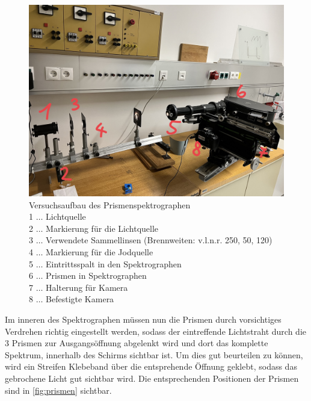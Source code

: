 \documentclass[12pt,english,ngerman]{scrartcl}
\begin{document}
\begin{figure}[H]
	\begin{center}
		\includegraphics[width =\textwidth]{./figures/Spektograph_new.png}
	\end{center}
	\caption[Versuchsaufbau des Prismenspektrographen] {Versuchsaufbau des
		Prismenspektrographen                                                    \\
		1 \(\dots\) Lichtquelle                                                  \\
		2 \(\dots\) Markierung für die Lichtquelle                               \\
		3 \(\dots\) Verwendete Sammellinsen (Brennweiten: v.l.n.r. 250, 50, 120) \\
		4 \(\dots\) Markierung für die Jodquelle                                 \\
		5 \(\dots\) Eintrittsspalt in den Spektrographen                         \\
		6 \(\dots\) Prismen in Spektrographen                                    \\
		7 \(\dots\) Halterung für Kamera                                         \\
		8 \(\dots\) Befestigte Kamera
	}\label{fig:aufbau_Spektograph}
\end{figure}

Im inneren des Spektrographen müssen nun die Prismen durch vorsichtiges
Verdrehen richtig eingestellt werden, sodass der eintreffende Lichtstraht durch
die 3 Prismen zur Ausgangsöffnung abgelenkt wird und dort das komplette
Spektrum, innerhalb des Schirms sichtbar ist. Um dies gut beurteilen zu können,
wird ein Streifen Klebeband über die entsprehende Öffnung geklebt, sodass das
gebrochene Licht gut sichtbar wird. Die entsprechenden Positionen der Prismen
sind in \autoref{fig:prismen} sichtbar.
\end{document}
